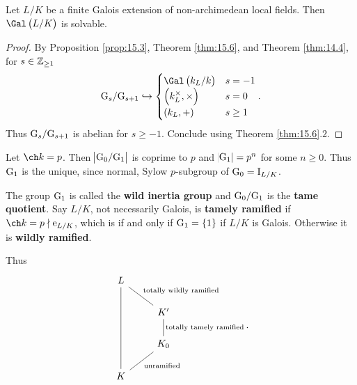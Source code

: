 
\begin{corollary}
Let $ L / K $ be a finite Galois extension of non-archimedean local fields. Then $ \Gal\br{L / K} $ is solvable.
\end{corollary}

\begin{proof}
By Proposition \ref{prop:15.3}, Theorem \ref{thm:15.6}, and Theorem \ref{thm:14.4}, for $ s \in \mathbb{Z}_{\ge 1} $
$$ \G_s / \G_{s + 1} \hookrightarrow
\begin{cases}
\Gal\br{k_L / k} & s = -1 \\
\br{k_L^\times, \times} & s = 0 \\
\br{k_L, +} & s \ge 1
\end{cases}.
$$
Thus $ \mathrm{G}_s / \mathrm{G}_{s + 1} $ is abelian for $ s \ge -1 $. Conclude using Theorem \ref{thm:15.6}.$ 2 $.
\end{proof}

Let $ \ch k = p $. Then $ \abs{\mathrm{G}_0 / \mathrm{G}_1} $ is coprime to $ p $ and $ \abs{\mathrm{G}_1} = p^n $ for some $ n \ge 0 $. Thus $ \mathrm{G}_1 $ is the unique, since normal, Sylow $ p $-subgroup of $ \mathrm{G}_0 = \mathrm{I}_{L / K} $.

\begin{definition}
The group $ \mathrm{G}_1 $ is called the \textbf{wild inertia group} and $ \mathrm{G}_0 / \mathrm{G}_1 $ is the \textbf{tame quotient}. Say $ L / K $, not necessarily Galois, is \textbf{tamely ramified} if $ \ch k = p \nmid \e_{L / K} $, which is if and only if $ \G_1 = \cbr{1} $ if $ L / K $ is Galois. Otherwise it is \textbf{wildly ramified}.
\end{definition}

Thus
$$
\begin{tikzcd}
L \arrow[dash]{dr}{\text{totally wildly ramified}} \arrow[dash]{ddd} & \\
& K' \arrow[dash]{d}{\text{totally tamely ramified}} \\
& K_0 \arrow[dash]{dl}{\text{unramified}} \\
K &
\end{tikzcd}.
$$

\pagebreak

